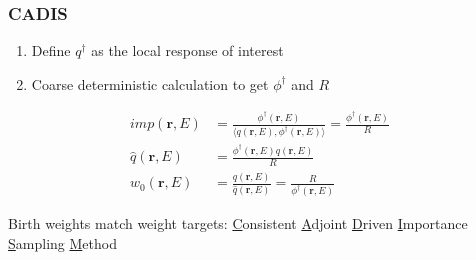 \documentclass[xcolor=x11names,compress]{beamer}
\renewcommand{\(}{\begin{columns}}
\renewcommand{\)}{\end{columns}}
\newcommand{\<}[1]{\begin{column}{#1}}
\renewcommand{\>}{\end{column}}
\newcommand{\ve}[1]{\ensuremath{\mathbf{#1}}}
\begin{document}
\begin{frame}[fragile]
  \frametitle{CADIS \cite{Wagner2007}}
  
  \begin{enumerate}
  \item Define $q^{\dagger}$ as the local response of interest\\
  \item Coarse deterministic calculation to get $\phi^{\dagger}$ and $R$
  \end{enumerate}
% 
\begin{align*}
  imp(\ve{r}, E) &= \frac{\phi^{\dagger}(\ve{r}, E)}{\langle q(\ve{r}, E), \phi^{\dagger}(\ve{r}, E) \rangle} = \frac{\phi^{\dagger}(\ve{r}, E)}{R} \\
  \hat{q}(\ve{r}, E) &= \frac{\phi^{\dagger}(\ve{r}, E) q(\ve{r}, E)}{R} \\
  w_0(\ve{r}, E) &= \frac{q(\ve{r}, E)}{\hat{q}(\ve{r}, E)} = \frac{R}{\phi^{\dagger}(\ve{r}, E)} 
  \label{eq:Importance}
\end{align*}

Birth weights match weight targets: \underline{C}onsistent \underline{A}djoint \underline{D}riven \underline{I}mportance \underline{S}ampling \underline{M}ethod

\end{frame}
\end{document}

